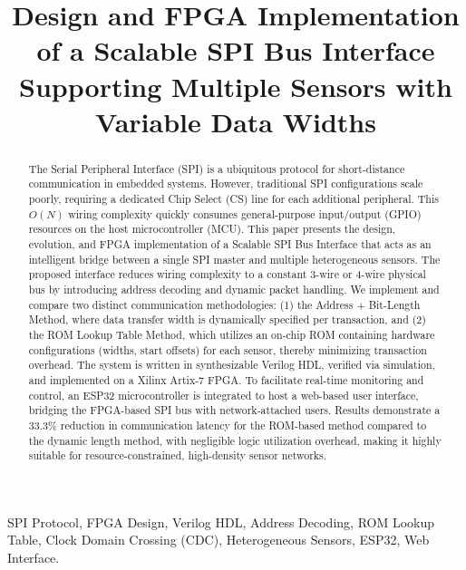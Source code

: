 \documentclass[conference]{IEEEtran}
\begin{document}
\title{Design and FPGA Implementation of a Scalable SPI Bus Interface Supporting Multiple Sensors with Variable Data Widths}

\author{
}

\maketitle

\begin{abstract}
The Serial Peripheral Interface (SPI) is a ubiquitous protocol for short-distance communication in embedded systems. However, traditional SPI configurations scale poorly, requiring a dedicated Chip Select (CS) line for each additional peripheral. This $O(N)$ wiring complexity quickly consumes general-purpose input/output (GPIO) resources on the host microcontroller (MCU). This paper presents the design, evolution, and FPGA implementation of a Scalable SPI Bus Interface that acts as an intelligent bridge between a single SPI master and multiple heterogeneous sensors. The proposed interface reduces wiring complexity to a constant 3-wire or 4-wire physical bus by introducing address decoding and dynamic packet handling. We implement and compare two distinct communication methodologies: (1) the Address + Bit-Length Method, where data transfer width is dynamically specified per transaction, and (2) the ROM Lookup Table Method, which utilizes an on-chip ROM containing hardware configurations (widths, start offsets) for each sensor, thereby minimizing transaction overhead. The system is written in synthesizable Verilog HDL, verified via simulation, and implemented on a Xilinx Artix-7 FPGA. To facilitate real-time monitoring and control, an ESP32 microcontroller is integrated to host a web-based user interface, bridging the FPGA-based SPI bus with network-attached users. Results demonstrate a 33.3\% reduction in communication latency for the ROM-based method compared to the dynamic length method, with negligible logic utilization overhead, making it highly suitable for resource-constrained, high-density sensor networks.
\end{abstract}

\begin{IEEEkeywords}
SPI Protocol, FPGA Design, Verilog HDL, Address Decoding, ROM Lookup Table, Clock Domain Crossing (CDC), Heterogeneous Sensors, ESP32, Web Interface.
\end{IEEEkeywords}
\end{document}
